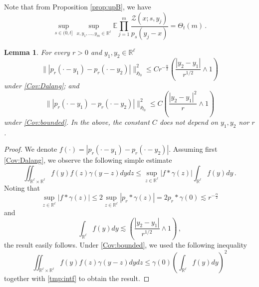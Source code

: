 \documentclass[12pt,reqno]{amsart}
\newtheorem{lemma}[theorem]{Lemma}
\theoremstyle{remark}
\newcommand{\1}{\mathbf{1}}
\def\RR{\mathbb{R}}
\def\EE{\mathbb{E}}
\def\HH{\mathfrak{H}}
\def\Z{\mathcal{Z}}
\def\lt{\left}
\def\rt{\right}
\def\HH{\mathfrak{H}}
\begin{document}
	Note that from Proposition \ref{prop:upB}, we have
	\begin{equation}\label{ineq:T1}
		\sup_{s\in(0, t]}\sup_{x,y_1,\dots,y_{m}\in\RR^\ell}\EE\prod_{j=1}^{m}\frac{\Z(x;s,y_j)}{p_s(y_j-x)}=\Theta_t(m)\,.
	\end{equation}
	\begin{lemma}\label{lem:pa}
		For every $r>0$ and $y_1,y_2\in\RR^\ell$
		\begin{equation*}
			\||p_r(\cdot-y_1)-p_r(\cdot-y_2)|\|^2_{\HH_0}\le C r^{-\frac \alpha2}\lt(\frac{|y_2-y_1|}{r^{1/2}}\wedge 1 \rt)
		\end{equation*}
		under  \ref{Cov:Dalang}; and
		\begin{equation*}
			\||p_r(\cdot-y_1)-p_r(\cdot-y_2)|\|^2_{\HH_0}\le C \lt(\frac{|y_2-y_1|^2}{r}\wedge 1 \rt)
		\end{equation*}
		under \ref{Cov:bounded}.
		In the above, the constant $C$ does not depend on $y_1,y_2$ nor $r$.
	\end{lemma}
	\begin{proof}
		We denote $f(\cdot)=|p_r(\cdot-y_1)-p_r(\cdot-y_2)|$. Assuming first \ref{Cov:Dalang}, we observe the following simple estimate
		\begin{equation*}
			\iint_{\RR^\ell\times\RR^\ell}f(y)f(z)\gamma(y-z)dydz\le\sup_{z\in\RR^\ell}|f*\gamma(z)| \int_{\RR^\ell}f(y)dy\,.
		\end{equation*}
		Noting that
		\begin{equation*}
			\sup_{z\in\RR^\ell}|f*\gamma(z)|\le 2\sup_{z\in\RR^\ell}|p_r*\gamma(z)|=2p_r*\gamma(0)\lesssim r^{-\frac \alpha2}
		\end{equation*}
		and
		\begin{equation}\label{tmp:intf}
			\int_{\RR^\ell}f(y)dy\lesssim \lt(\frac{|y_2-y_1|}{r^{1/2}}\wedge 1 \rt)\,,
		\end{equation}
		the result easily follows. Under \ref{Cov:bounded}, we used the following inequality
		\begin{equation*}
			\iint_{\RR^\ell\times\RR^\ell}f(y)f(z)\gamma(y-z)dydz\le \gamma(0)\lt(\int_{\RR^\ell}f(y)dy \rt)^2
		\end{equation*}
		together with \eqref{tmp:intf} to obtain the result.
	\end{proof}
	
\end{document}
